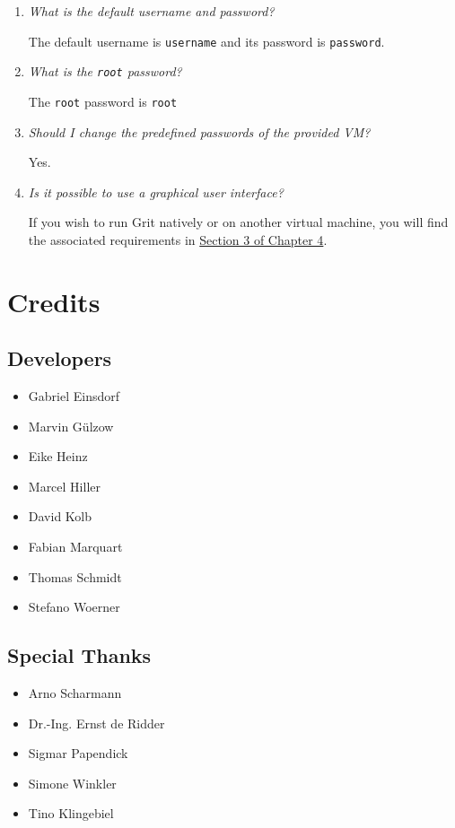 \documentclass[10pt,a4paper, titlepage, toc=idx]{scrreprt}
\theoremstyle{definition}
\theoremstyle{plain}
\newcommand*{\product}{Grit}
\begin{document}
\begin{enumerate}
        \item \textit{What is the default username and password?}
		
          The default username is {\tt username} and its password is
          {\tt password}.
		
        \item \textit{What is the {\tt root} password?}
		
          The {\tt root} password is {\tt root}
		
        \item \textit{Should I change the predefined passwords of the
            provided VM?}
		
          Yes.
		
        \item \textit{Is it possible to use a graphical user
            interface?}
		
          If you wish to run \product{} natively or on another virtual
          machine, you will find the associated requirements in
          \hyperref[4.3]{Section 3 of Chapter 4}.
		
	\end{enumerate}
	\chapter{Credits}
	\section{Developers}
	\begin{itemize}[label=]
        \item Gabriel Einsdorf
        \item Marvin Gülzow
        \item Eike Heinz
        \item Marcel Hiller
        \item David Kolb
        \item Fabian Marquart
        \item Thomas Schmidt
        \item Stefano Woerner
	\end{itemize}
	\section{Special Thanks}
	\begin{itemize}[label=]
        \item Arno Scharmann
        \item Dr.-Ing. Ernst de Ridder
        \item Sigmar Papendick
        \item Simone Winkler
        \item Tino Klingebiel
	\end{itemize}
      
\end{document}
